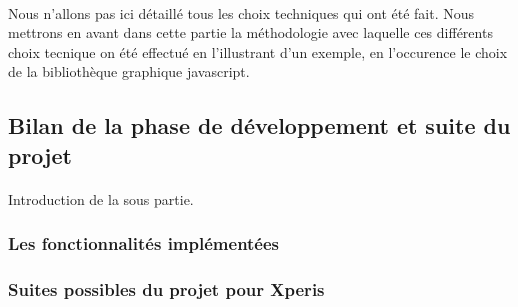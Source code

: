 			\paragraph{}%
			Nous n'allons pas ici détaillé tous les choix techniques qui ont été fait.
			Nous mettrons en avant dans cette partie la méthodologie avec laquelle ces
			différents choix tecnique on été effectué en l'illustrant d'un exemple, en
			l'occurence le choix de la bibliothèque graphique javascript.
	
	\subsection{Bilan de la phase de développement et suite du projet}
		\paragraph{}
		Introduction de la sous partie.
		
		\subsubsection{Les fonctionnalités implémentées}
		\subsubsection{Suites possibles du projet pour Xperis}